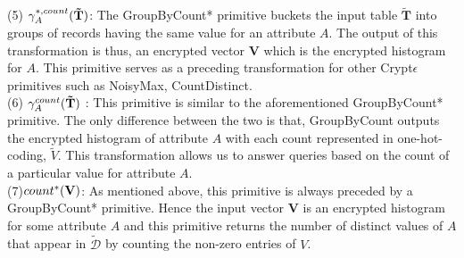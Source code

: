 (5) $\gamma^{*,count}_{A}(\mathbf{\tilde{T}})$: The  \textsf{GroupByCount*} primitive buckets the input table $\mathbf{\tilde{T}}$ into groups of records having the same value for an attribute $A$. The output of this transformation is thus, an encrypted  vector $\mathbf{V}$ which is the encrypted histogram for $A$.
    This primitive serves as a preceding transformation for other Crypt$\epsilon$ primitives such as \textsf{NoisyMax}, \textsf{CountDistinct}.\\
(6) $\gamma^{count}_{A}(\mathbf{\tilde{T}})$ : This primitive is similar to the aforementioned \textsf{GroupByCount*} primitive. The only difference between the two is that, \textsf{GroupByCount} outputs the encrypted histogram of attribute $A$ with each count represented in one-hot-coding, $\tilde{V}$.  This transformation allows us to answer queries based on the count of a particular value for attribute $A$.\\
(7)$count^*(\mathbf{V})$: As mentioned above, this primitive is always preceded by a \textsf{GroupByCount*} primitive. Hence the input vector $\mathbf{V}$ is an encrypted histogram for some attribute $A$ and this primitive returns the number of distinct values of $A$ that appear in  $\boldsymbol{\tilde{\mathcal{D}}}$ by counting the non-zero entries of $V$.
